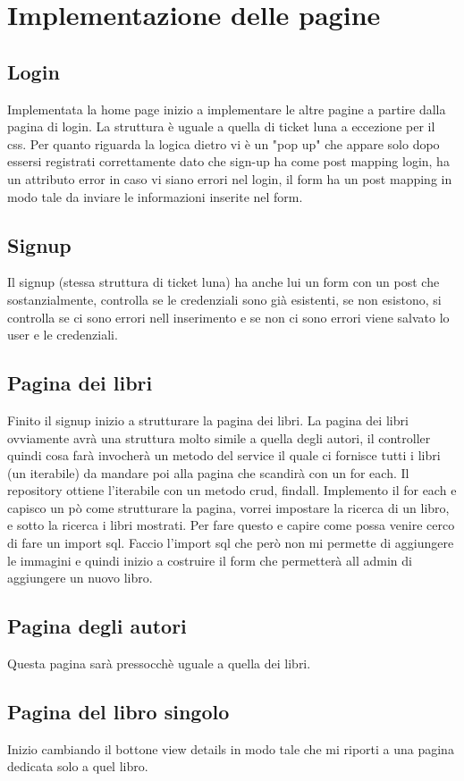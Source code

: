 \documentclass{article}
\numberwithin{equation}{subsection}
\begin{document}
\section{Implementazione delle pagine}
\subsection{Login}
Implementata la home page inizio a implementare le altre pagine a partire dalla pagina di login. La struttura è uguale a quella di ticket luna a eccezione per il css. Per quanto riguarda la logica dietro vi è un "pop up" che appare solo dopo essersi registrati correttamente dato che sign-up ha come post mapping login, ha un attributo error in caso vi siano errori nel login, il form ha un post mapping in modo tale da inviare le informazioni inserite nel form.
\subsection{Signup}
Il signup (stessa struttura di ticket luna) ha anche lui un form con un post che sostanzialmente, controlla se le credenziali sono già esistenti, se non esistono, si controlla se ci sono errori nell inserimento e se non ci sono errori viene salvato lo user e le credenziali.
\subsection{Pagina dei libri}
Finito il signup inizio a strutturare la pagina dei libri. La pagina dei libri ovviamente avrà una struttura molto simile a quella degli autori, il controller quindi cosa farà invocherà un metodo del service il quale ci fornisce tutti i libri (un iterabile) da mandare poi alla pagina che scandirà con un for each. Il repository ottiene l'iterabile con un metodo crud, findall. Implemento il for each e capisco un pò come strutturare la pagina, vorrei impostare la ricerca di un libro, e sotto la ricerca i libri mostrati. Per fare questo e capire come possa venire cerco di fare un import sql. Faccio l'import sql che però non mi permette di aggiungere le immagini e quindi inizio a costruire il form che permetterà all admin di aggiungere un nuovo libro.
\subsection{Pagina degli autori}
Questa pagina sarà pressocchè uguale a quella dei libri.
\subsection{Pagina del libro singolo}
Inizio cambiando il bottone view details in modo tale che mi riporti a una pagina dedicata solo a quel libro. 
\end{document}
